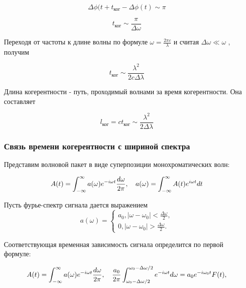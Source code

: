 \begin{equation*}
    \Delta \phi(t+t_{\text{ког}} - \Delta \phi(t) \sim \pi
\end{equation*}

\begin{equation*}
    t_{\text{ког}} \sim \frac{\pi}{\Delta \omega}
\end{equation*}

Переходя от частоты к длине волны по формуле $\omega = \frac{2\pi c}{\lambda}$ и считая $\Delta \omega \ll \omega$ , получим

\begin{equation*}
    t_{\text{ког}} \sim \frac{\lambda^2}{2c\Delta \lambda}
\end{equation*}


Длина когерентности - путь, проходимый волнами за время когерентности. Она составляет



\begin{equation*}
    l_{\text{ког}} = c t_{\text{ког}} \sim \frac{\lambda ^2}{2\Delta \lambda}
\end{equation*}

\subsubsection{Связь времени когерентности с шириной спектра}

Представим волновой пакет в виде суперпозиции монохроматических волн:

\begin{equation*}
    A(t) = \int_{-\infty}^{\infty} a(\omega)e^{-i\omega t} \frac{d\omega}{2\pi},\hspace{10px} a(\omega) = \int_{-\infty}^{\infty} A(t)e^{i\omega t}dt 
\end{equation*}


Пусть фурье-спектр сигнала дается выражением
\begin{equation*}
    a(\omega) = \begin{cases}
   a_0, |\omega-\omega_0| < \frac{\Delta \omega}{2}, \\
   0, |\omega-\omega_0| > \frac{\Delta \omega}{2}.
 \end{cases}
\end{equation*}

Соответствующая временная зависимость сигнала определится по первой формуле:

\begin{equation*}
    A(t) = \int_{-\infty}^{\infty} a(\omega)e^{-i\omega t} \frac{d\omega}{2\pi},\hspace{10px} \frac{a_0}{2\pi}\int_{\omega_0-\Delta\omega/2}^{\omega_0-\Delta\omega/2}e^{-i\omega t} d\omega = a_0 e^{-i\omega_0 t} F(t),
 \end{equation*}   
    
